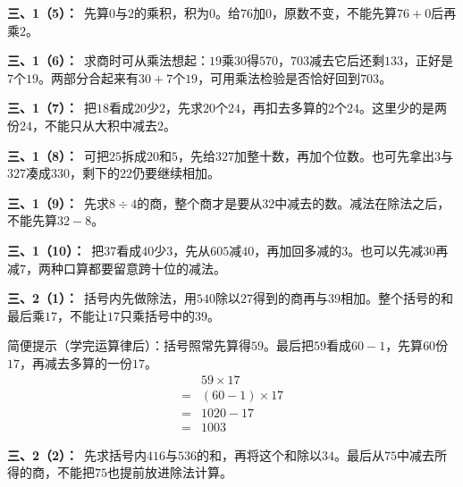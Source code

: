 \documentclass[multi=snippet,border=0pt]{standalone}
\newenvironment{snippet}[3]{\begin{minipage}{#1bp}\color{answerred}\fontsize{#2}{#3}\selectfont\raggedright}{\end{minipage}}
\begin{document}
\begin{snippet}{505}{11.5}{14}\textbf{三、1（5）：}\ 先算\(0\)与\(2\)的乘积，积为\(0\)。给\(76\)加\(0\)，原数不变，不能先算\(76+0\)后再乘\(2\)。\end{snippet}
\begin{snippet}{505}{11.5}{14}\textbf{三、1（6）：}\ 求商时可从乘法想起：\(19\)乘\(30\)得\(570\)，\(703\)减去它后还剩\(133\)，正好是\(7\)个\(19\)。两部分合起来有\(30+7\)个\(19\)，可用乘法检验是否恰好回到\(703\)。\end{snippet}
\begin{snippet}{505}{11.5}{14}\textbf{三、1（7）：}\ 把\(18\)看成\(20\)少\(2\)，先求\(20\)个\(24\)，再扣去多算的\(2\)个\(24\)。这里少的是两份\(24\)，不能只从大积中减去\(2\)。\end{snippet}
\begin{snippet}{505}{11.5}{14}\textbf{三、1（8）：}\ 可把\(25\)拆成\(20\)和\(5\)，先给\(327\)加整十数，再加个位数。也可先拿出\(3\)与\(327\)凑成\(330\)，剩下的\(22\)仍要继续相加。\end{snippet}
\begin{snippet}{505}{11.5}{14}\textbf{三、1（9）：}\ 先求\(8\div4\)的商，整个商才是要从\(32\)中减去的数。减法在除法之后，不能先算\(32-8\)。\end{snippet}
\begin{snippet}{505}{11.5}{14}\textbf{三、1（10）：}\ 把\(37\)看成\(40\)少\(3\)，先从\(605\)减\(40\)，再加回多减的\(3\)。也可以先减\(30\)再减\(7\)，两种口算都要留意跨十位的减法。\end{snippet}
\begin{snippet}{505}{11.5}{14}\textbf{三、2（1）：}\ 括号内先做除法，用\(540\)除以\(27\)得到的商再与\(39\)相加。整个括号的和最后乘\(17\)，不能让\(17\)只乘括号中的\(39\)。\par 简便提示（学完运算律后）：括号照常先算得\(59\)。最后把\(59\)看成\(60-1\)，先算\(60\)份\(17\)，再减去多算的一份\(17\)。\[\begin{aligned}&59\times17\\={}&(60-1)\times17\\={}&1020-17\\={}&1003\end{aligned}\]\end{snippet}
\begin{snippet}{505}{11.5}{14}\textbf{三、2（2）：}\ 先求括号内\(416\)与\(536\)的和，再将这个和除以\(34\)。最后从\(75\)中减去所得的商，不能把\(75\)也提前放进除法计算。\end{snippet}
\end{document}
